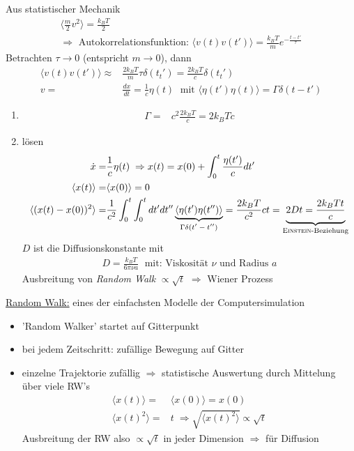 \documentclass[12pt]{article}
\begin{document}
Aus statistischer Mechanik
\begin{align}
\langle \frac{m}{2} v^2 \rangle = \frac{k_B T}{2} \\
\Rightarrow \mbox{ Autokorrelationsfunktion: } 
\langle v(t) v(t') \rangle = \frac{k_B T}{m} e^{- \frac{t-t'}{\tau}}
\end{align}
Betrachten $\tau \to 0$ (entspricht $ m\to 0$), dann
\begin{align}
\langle v(t) v(t') \rangle \approx & \frac{2 k_B T}{m} \tau \delta (t_t') =\frac{2 k_B T}{c} \delta (t_t') \\
v=& \frac{dx}{dt}= \frac{1}{c} \eta (t) \; \mbox{ mit } \langle \eta (t') \eta (t) \rangle = \Gamma \delta (t-t') 
\end{align}
\begin{enumerate} 
\item
\begin{align}
\Gamma =& c^2 \frac{2 k_B T}{c} = 2 k_B T c
\end{align}
\item lösen \begin{align}
\dot{x}= & \frac{1}{c} \eta (t) \; \Rightarrow x(t) = x(0) + \int_0^t \frac{\eta (t')}{c} dt' \\
\langle x(t) \rangle =& \langle x(0) \rangle = 0 \\
\langle (x(t) - x(0))^2 \rangle =& \frac{1}{c^2} \int_0^t \int_0^t dt' dt'' \underbrace{\langle \eta (t') \eta (t'') \rangle}_\text{$ \Gamma \delta (t' - t'')$} = \frac{2 k_B T}{c^2} c t = \underbrace{2 D t = \frac{2 k_B T t}{c}}_\text{\textsc{Einstein}-Beziehung}
\end{align}
$D$ ist die Diffusionskonstante mit \begin{align}
D= \frac{k_B T}{6 \pi \nu a} \; \mbox{ mit: Viskosität } \nu \mbox{ und Radius } a
\end{align}
Ausbreitung von \textit{Random Walk} $\propto \sqrt{t}$ $\Rightarrow$ Wiener Prozess
\end{enumerate}
\underline{Random Walk:} eines der einfachsten Modelle der Computersimulation
\begin{itemize}
\item 'Random Walker' startet auf Gitterpunkt
\item bei jedem Zeitschritt: zufällige Bewegung auf Gitter
\item einzelne Trajektorie zufällig $\Rightarrow$ statistische Auswertung durch Mittelung über viele RW's
\begin{align*}
\langle x(t) \rangle =& \langle x(0) \rangle = x(0) \\
\langle x(t)^2 \rangle = & t \; \Rightarrow \sqrt{\langle x(t)^2 \rangle} \propto \sqrt{t}
\end{align*}
Ausbreitung der RW also $\propto \sqrt{t}$ in jeder Dimension $\Rightarrow$ für Diffusion
\end{itemize}
\end{document}

